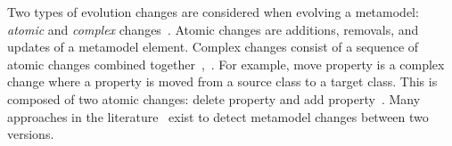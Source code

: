  
 Two types of evolution changes are considered when evolving a metamodel: \emph{atomic} and \emph{complex} changes~\cite{hebig2016approaches,Herrmannsdoerfer2011}. 
 Atomic changes are additions, removals, and updates of a metamodel element. Complex changes consist of a sequence of atomic changes combined together~\cite{vermolen_reconstructing_2012},~\cite{khelladi2015detecting}. For example, move property is a complex change where a property is moved from a source class to a target class. This is composed of two atomic changes: delete property and add property~\cite{Herrmannsdoerfer2011}. 
 Many approaches in the literature~\cite{Alter2015, williams2012searching,cicchetti_managing_2009,langer_posteriori_2013,vermolen_reconstructing_2012,Khelladi2016,bettini2022executable} exist to detect metamodel changes between two versions.
% 	
% 		
% 	
 	
 	  
 	
